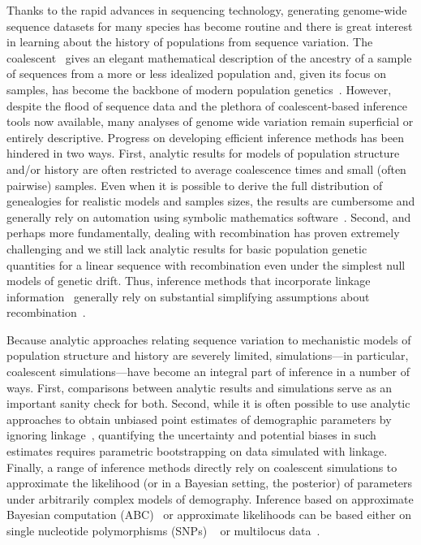 \documentclass[graybox]{svmult}
\begin{document}
Thanks to the rapid advances in sequencing technology, generating
genome-wide sequence datasets for many species has become routine and
there is great interest in learning about the history of
populations from sequence variation. The
coalescent~\citep{hudson1983testing,kingman1982coalescent,Tajima1983Evolutionary}
gives an
elegant mathematical description of the ancestry of a sample of
sequences from a more or less idealized population and, given its focus
on samples, has become the backbone of modern population
genetics~\citep{hudson1990gene,wakely2008coalescent}.
However, despite the flood of sequence data and the plethora of
coalescent-based inference tools now available, many analyses of genome
wide variation remain superficial or entirely descriptive. Progress on
developing efficient inference methods has been hindered in two ways.
First, analytic results for models of population structure and/or history are
often restricted to average coalescence times and small (often pairwise)
samples. Even when it is possible to derive the full distribution of
genealogies for realistic models and samples sizes, the results are
cumbersome and generally rely on automation using symbolic mathematics software~\citep{Lohse2016}. Second, and
perhaps more fundamentally, dealing with recombination has proven
extremely challenging and we still lack analytic results for basic population genetic quantities for a linear sequence with recombination even under the simplest null models of
genetic drift. Thus, inference methods that
incorporate linkage information~\citep{li2011inference,harris2013inferring} generally rely on substantial simplifying
assumptions about recombination~\citep{mcvean2005approximating}.

Because analytic approaches relating sequence variation to mechanistic models
of population structure and history are severely limited, simulations---in particular, coalescent
simulations---have become an integral part of inference in a number of ways.
First, comparisons between analytic results and simulations serve as an important
sanity check for both. Second, while it is often possible to use analytic
approaches to obtain unbiased point estimates of demographic parameters by
ignoring linkage~\citep{gutenkunst2009inferring}, quantifying the uncertainty
and potential biases in such estimates requires parametric bootstrapping on
data simulated with linkage. Finally, a range of inference methods directly rely on
coalescent simulations to approximate the likelihood (or in a Bayesian setting,
the posterior) of parameters under arbitrarily complex models of demography.
Inference based on approximate Bayesian computation (ABC)~\citep{Beaumont2002,
Cornuet2008} or approximate likelihoods can be based either on single nucleotide polymorphisms (SNPs)
~\citep{excoffier2013} or multilocus data~\citep{becquet2007new, Beeravolu2017}.
\end{document}
